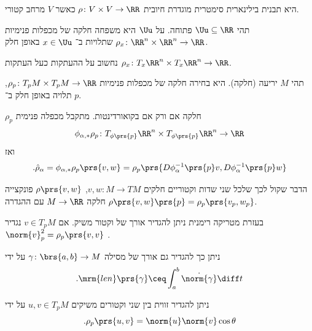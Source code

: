 \documentclass[a4paper,10pt,twoside,openany]{book}
\begin{document}
\begin{definition}
היא תבנית בילינארית סימטרית מוגדרת חיובית
$\rho \colon V\times V \to \RR$
כאשר
$V$
מרחב קטורי.
\end{definition}
\begin{definition}
תהי
$\Uu \subseteq \RR$
פתוחה.
על
$\Uu$
היא משפחה חלקה של מכפלות פנימיות
$\rho_x \colon \RR^n \times \RR^n \to \RR$
שתלויות ב־%
$x \in \Uu$
באופן חלק.
\end{definition}
\begin{remark}
נחשוב על ההעתקות כעל העתקות
$\rho_x \colon T_x \RR^n \times T_x\RR^n \to \RR$.
\end{remark}
\begin{definition}
תהי
$M$
יריעה (חלקה).
היא בחירה חלקה של מכפלות פנימיות
$\rho_p \colon T_p M \times T_p M \to \RR$,
תלויה באופן חלק ב־%
$p$.
\end{definition}
\begin{remark}
$\rho_p$
חלקה אם ורק אם בקואורדינטות.
מתקבל מכפלה פנימית
\[\phi_{\alpha,*} \rho_p \colon T_{\phi\prs{p}}\RR^n \times T_{\phi\prs{p}}\RR^n \to \RR\]
ואז
\begin{align*}
\text{.} \hat{\rho}_{\alpha} = \phi_{\alpha, *}\rho_p\prs{v,w} = \rho_p \prs{D\phi_{\alpha}^{-1}\prs{p} v, D\phi_{\alpha}^{-1}\prs{p} w}
\end{align*}
\end{remark}
\begin{remark}
הדבר שקול לכך שלכל שני שדות וקטוריים חלקים
$v,w \colon M \to TM$,
$\rho\prs{v,w}$
פונקצייה חלקה
$M \to \RR$
עם ההגדרה
$\rho\prs{v,w}\prs{p} = \rho_p \prs{v_p, w_p}$.
\end{remark}

בעזרת מטריקה רימנית ניתן להגדיר אורך של וקטור משיק. אם
$v \in T_p M$
נגדיר
$\norm{v}_p^2 = \rho_p\prs{v,v}$
.

ניתן כך להגדיר גם אורך של מסילה
$\gamma \colon \brs{a,b} \to M$
על ידי
\[\text{.} \mrm{len}\prs{\gamma} \ceq \int_a^b \dot{\norm{\gamma}} \diff t\]

ניתן להגדיר זווית בין שני וקטורים משיקים
$u,v \in T_p M$
על ידי
\[\text{.} \rho_p\prs{u,v} = \norm{u} \norm{v} \cos \theta\]
\end{document}
